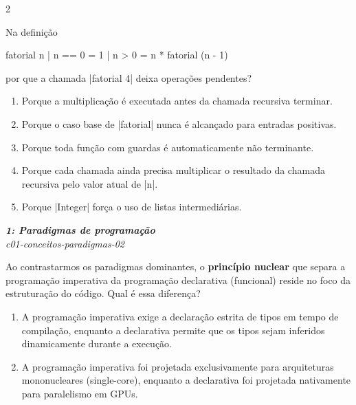 \documentclass[a4paper,10pt,brazil]{article}
\begin{document}
\begin{multicols}{2}
\begin{flushright}
\end{flushright}
Na definição
\begin{haskellcode}
fatorial n
  | n == 0 = 1
  | n > 0  = n * fatorial (n - 1)
\end{haskellcode}
por que a chamada \haskellinline|fatorial 4| deixa operações pendentes?

\begin{enumerate}
  \item Porque a multiplicação é executada antes da chamada recursiva terminar.

  \item Porque o caso base de \haskellinline|fatorial| nunca é alcançado para entradas positivas.

  \item Porque toda função com guardas é automaticamente não terminante.

  \item Porque cada chamada ainda precisa multiplicar o resultado da chamada recursiva pelo valor atual de \haskellinline|n|.

  \item Porque \haskellinline|Integer| força o uso de listas intermediárias.


\end{enumerate}

\begin{flushright}
  \footnotesize
  \textit{\textbf{1: Paradigmas de programação}}\\
  \textit{c01-conceitos-paradigmas-02}\\

\end{flushright}
Ao contrastarmos os paradigmas dominantes, o \textbf{princípio nuclear} que separa a programação imperativa da programação declarativa (funcional) reside no foco da estruturação do código. Qual é essa diferença?

\begin{enumerate}
  \item A programação imperativa exige a declaração estrita de tipos em tempo de compilação, enquanto a declarativa permite que os tipos sejam inferidos dinamicamente durante a execução.

  \item A programação imperativa foi projetada exclusivamente para arquiteturas mononucleares (single-core), enquanto a declarativa foi projetada nativamente para paralelismo em GPUs.


\end{enumerate}
\end{multicols}
\end{document}
